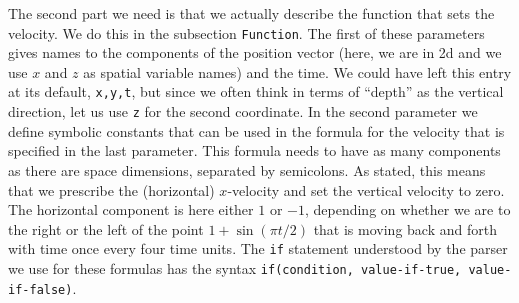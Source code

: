 \documentclass{article}
\begin{document}
The second part we need is that we actually describe the function that sets the
velocity. We do this in the subsection \texttt{Function}. The first of these
parameters gives names to the components of the position vector (here, we are
in 2d and we use $x$ and $z$ as spatial variable names) and the time. We could
have left this entry at its default, \texttt{x,y,t}, but since we
often think in terms of ``depth'' as the vertical direction, let us use
\texttt{z} for the second coordinate.
In the second parameter we define symbolic constants that can be used
in the formula for the velocity that is specified in the last parameter. This
formula needs to have as many components as there are space dimensions,
separated by semicolons. As stated, this means that we prescribe the
(horizontal) $x$-velocity and set the vertical velocity to zero. The horizontal
component is here either $1$ or $-1$, depending on whether we are to the right
or the left of the point $1+\sin(\pi t/2)$ that is moving back and forth with
time once every four time units. The \texttt{if} statement understood by the
parser we use for these formulas has the syntax
\texttt{if(condition, value-if-true, value-if-false)}.
\end{document}
